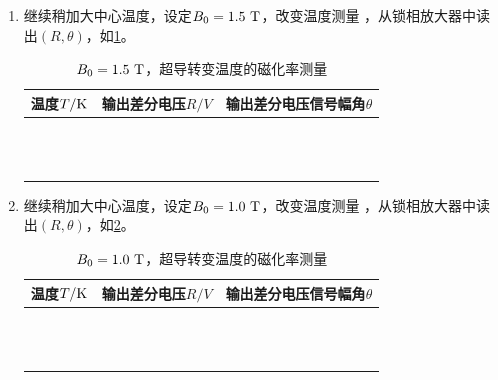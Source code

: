 \documentclass[11pt,a4paper]{ctexart}
\newcommand{\unit}[1]{\rm \ #1}
\begin{document}
\begin{enumerate}
\begin{table}[H]
\begin{tabular}{|p{32mm}|p{32mm}|p{32mm}|}
  \end{tabular}
  \end{table}
 \item
 继续稍加大中心温度，设定$B_0 = 1.5\unit{T}$，改变温度测量 ，从锁相放大器中读出$(R,\theta)$，如\cref{table9}。
  \begin{table}[H]
\centering
\caption{$B_0 = 1.5\unit{T}$，超导转变温度的磁化率测量\label{table9}}
\begin{tabular}{|p{32mm}|p{32mm}|p{32mm}|}
\hline
温度$T/{\rm K}$ & 输出差分电压$R/{V}$ & 输出差分电压信号幅角$\theta$ \\ \hline
& & \\ \hline
  & & \\ \hline
& & \\ \hline
   & & \\ \hline
    & & \\ \hline
 & & \\ \hline
  &  &\\ \hline
  &  &\\ \hline
  &  &\\ \hline
  &  &\\ \hline
  &  &\\ \hline
  &  &\\ \hline
  \end{tabular}
  \end{table}
 
  \item
 继续稍加大中心温度，设定$B_0 = 1.0\unit{T}$，改变温度测量 ，从锁相放大器中读出$(R,\theta)$，如\cref{table10}。
  \begin{table}[H]
\centering
\caption{$B_0 = 1.0\unit{T}$，超导转变温度的磁化率测量\label{table10}}
\begin{tabular}{|p{32mm}|p{32mm}|p{32mm}|}
\hline
温度$T/{\rm K}$ & 输出差分电压$R/{V}$ & 输出差分电压信号幅角$\theta$ \\ \hline
& & \\ \hline
  & & \\ \hline
& & \\ \hline
   & & \\ \hline
    & & \\ \hline
 & & \\ \hline
  &  &\\ \hline
  &  &\\ \hline
  &  &\\ \hline
  &  &\\ \hline
  &  &\\ \hline
  &  &\\ \hline
  \end{tabular}
  \end{table}
  

\end{enumerate}
\end{document}
